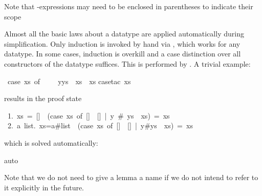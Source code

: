\begin{isabellebody}
\begin{isamarkuptext}
Note that -expressions may need to be enclosed in parentheses to
indicate their scope%
\end{isamarkuptext}%
%
%
\begin{isamarkuptext}%
Almost all the basic laws about a datatype are applied automatically during
simplification. Only induction is invoked by hand via ,
which works for any datatype. In some cases, induction is overkill and a case
distinction over all constructors of the datatype suffices. This is performed
by . A trivial example:%
\end{isamarkuptext}%
\ {\isachardoublequote}{\isacharparenleft}case\ xs\ of\ {\isacharbrackleft}{\isacharbrackright}\ {\isasymRightarrow}\ {\isacharbrackleft}{\isacharbrackright}\ {\isacharbar}\ y{\isacharhash}ys\ {\isasymRightarrow}\ xs{\isacharparenright}\ {\isacharequal}\ xs{\isachardoublequote}\isanewline
{}case{\isacharunderscore}tac\ xs{\isacharparenright}%
\begin{isamarkuptxt}%
\noindent
results in the proof state
\begin{isabelle}
~1.~xs~=~[]~{\isasymLongrightarrow}~(case~xs~of~[]~{\isasymRightarrow}~[]~|~y~\#~ys~{\isasymRightarrow}~xs)~=~xs\isanewline
~2.~{\isasymAnd}a~list.~xs=a\#list~{\isasymLongrightarrow}~(case~xs~of~[]~{\isasymRightarrow}~[]~|~y\#ys~{\isasymRightarrow}~xs)~=~xs%
\end{isabelle}
which is solved automatically:%
\end{isamarkuptxt}%
auto{\isacharparenright}%
\begin{isamarkuptext}%
Note that we do not need to give a lemma a name if we do not intend to refer
to it explicitly in the future.%
\end{isamarkuptext}%
\end{isabellebody}%
